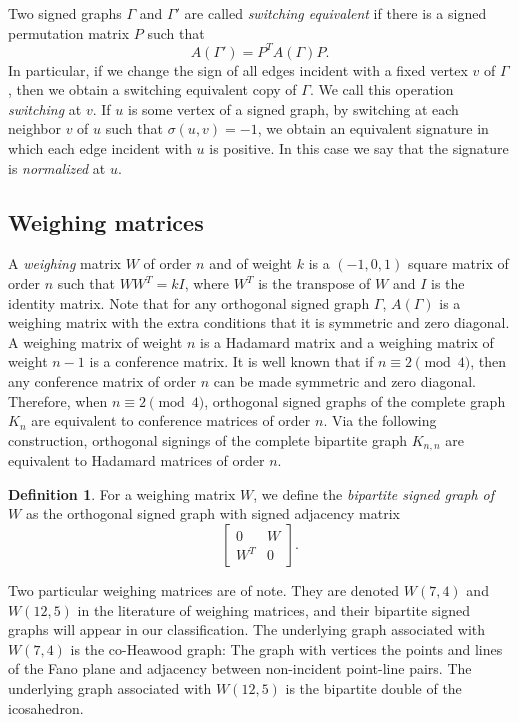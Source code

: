 \documentclass[11pt]{article}
\theoremstyle{plain}
\theoremstyle{definition}
\newtheorem{definition}[theorem]{Definition}
\begin{document}
Two signed graphs $\Gamma$ and $\Gamma'$ are called {\sl switching equivalent} if there is a signed permutation
matrix $P$  such that $$A(\Gamma')=P^TA(\Gamma)P.$$
In particular, if we change the sign of all edges incident with a fixed vertex $v$ of  $\Gamma$, then we obtain a switching equivalent copy of $\Gamma$.
We call this operation {\sl switching } at $v$. If $u$ is some vertex of a signed graph, by switching at each neighbor $v$ of $u$ such that $\sigma(u,v)=-1$, we obtain an equivalent signature in which each edge incident with $u$ is positive. In this case we say that the signature is {\sl normalized} at $u$. 



\subsection{Weighing matrices}

A {\it   weighing} matrix $W$  of order $n$ and of weight $k$  is a $(-1,0,1)$ square matrix of  order $n$ such that $WW^T=kI$, where $W^T$ is
the transpose of $W$ and $I$ is the identity matrix.
Note that for  any   orthogonal signed graph  $\Gamma$,  $A(\Gamma)$  is a  weighing matrix with the extra conditions that it is symmetric and  zero diagonal.
A weighing matrix of weight $n$ is a Hadamard matrix and a weighing matrix of weight $n-1$ is a conference matrix.
It is well known that if $n\equiv 2 \pmod{4}$,  then any  conference matrix of order $n$ can be made  symmetric and zero diagonal.
Therefore, when $n\equiv 2 \pmod{4}$, orthogonal  signed graphs of the complete graph  $K_n$ are equivalent to conference matrices  of  order $n$.
Via the following construction, orthogonal  signings of the complete bipartite graph  $K_{n,n}$ are equivalent to   Hadamard matrices  of  order $n$.
\begin{definition}\label{defBiW}
For a weighing matrix $W$, we define the {\sl bipartite signed graph of $W$} as the orthogonal signed graph with signed adjacency matrix
$$\begin{bmatrix}
0 & W\\
W^T & 0
\end{bmatrix}.$$
\end{definition}

Two particular weighing matrices are of note. They are denoted $W(7,4)$ and $W(12,5)$ in the literature of weighing matrices, and their bipartite signed graphs will appear in our classification. The underlying graph associated with $W(7,4)$ is the co-Heawood graph: The graph with vertices the points and lines of the Fano plane and adjacency between non-incident point-line pairs.
The underlying graph associated with $W(12,5)$ is the bipartite double of the icosahedron. 
\end{document}
